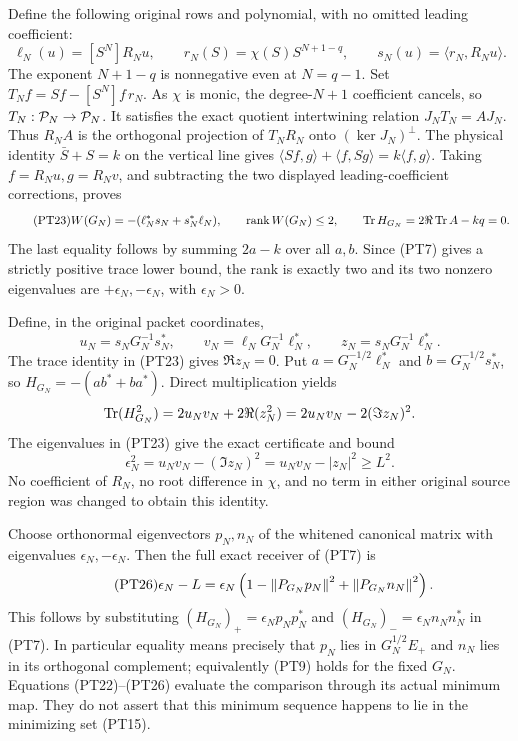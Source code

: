 Define the following original rows and polynomial, with no omitted
leading coefficient:
\begin{equation}\tag{PT22}
 \ell_N(u)=[S^N]R_Nu,\qquad
 r_N(S)=\chi(S)S^{N+1-q},\qquad
 s_N(u)=\langle r_N,R_Nu\rangle.
\end{equation}
The exponent \(N+1-q\) is nonnegative even at \(N=q-1\).
Set \(T_Nf=Sf-[S^N]f\,r_N\). As \(\chi\) is monic,
the degree-\(N+1\) coefficient cancels, so \(T_N:\mathcal P_N\to\mathcal P_N\).
It satisfies the exact quotient intertwining relation
\(J_NT_N=AJ_N\). Thus \(R_NA\) is the orthogonal projection
of \(T_NR_N\) onto \((\ker J_N)^\perp\).
The physical identity \(\bar S+S=k\) on the vertical line gives
\(\langle Sf,g\rangle+\langle f,Sg\rangle=k\langle f,g\rangle\).
Taking \(f=R_Nu,g=R_Nv\), and subtracting the two displayed
leading-coefficient corrections, proves
\begin{equation}\tag{PT23}
 W(G_N)=-(\ell_N^*s_N+s_N^*\ell_N),\qquad
 \operatorname{rank} W(G_N)\le2,\qquad
 \operatorname{Tr} H_{G_N}=2\Re\operatorname{Tr} A-kq=0.
\end{equation}
The last equality follows by summing \(2a-k\) over all \(a,b\).
Since (PT7) gives a strictly positive trace lower bound, the rank
is exactly two and its two nonzero eigenvalues are
\(+\epsilon_N,-\epsilon_N\), with \(\epsilon_N>0\).

Define, in the original packet coordinates,
\begin{equation}\tag{PT24}
 u_N=s_NG_N^{-1}s_N^*,\qquad
 v_N=\ell_NG_N^{-1}\ell_N^*,\qquad
 z_N=s_NG_N^{-1}\ell_N^*.
\end{equation}
The trace identity in (PT23) gives \(\Re z_N=0\). Put
\(a=G_N^{-1/2}\ell_N^*\) and \(b=G_N^{-1/2}s_N^*\),
so \(H_{G_N}=-(ab^*+ba^*)\). Direct multiplication yields
\[
 \operatorname{Tr}(H_{G_N}^2)=2u_Nv_N+2\Re(z_N^2)
                 =2u_Nv_N-2(\Im z_N)^2.
\]
The eigenvalues in (PT23) give the exact certificate and bound
\begin{equation}\tag{PT25}
 \epsilon_N^2=u_Nv_N-(\Im z_N)^2
             =u_Nv_N-|z_N|^2\ge L^2.
\end{equation}
No coefficient of \(R_N\), no root difference in \(\chi\),
and no term in either original source region was changed to obtain
this identity.

Choose orthonormal eigenvectors \(p_N,n_N\) of the whitened
canonical matrix with eigenvalues \(\epsilon_N,-\epsilon_N\).
Then the full exact receiver of (PT7) is
\begin{equation}\tag{PT26}
 \epsilon_N-L
 =\epsilon_N\left(1-\left\lVert P_{G_N}p_N\right\rVert^2
                         +\left\lVert P_{G_N}n_N\right\rVert^2\right).
\end{equation}
This follows by substituting
\((H_{G_N})_+=\epsilon_Np_Np_N^*\) and
\((H_{G_N})_-=\epsilon_Nn_Nn_N^*\) in (PT7).
In particular equality means precisely that \(p_N\) lies in
\(G_N^{1/2}E_+\) and \(n_N\) lies in its orthogonal complement;
equivalently (PT9) holds for the fixed \(G_N\).
Equations (PT22)--(PT26) evaluate the comparison through its actual
minimum map. They do not assert that this minimum sequence happens
to lie in the minimizing set (PT15).

